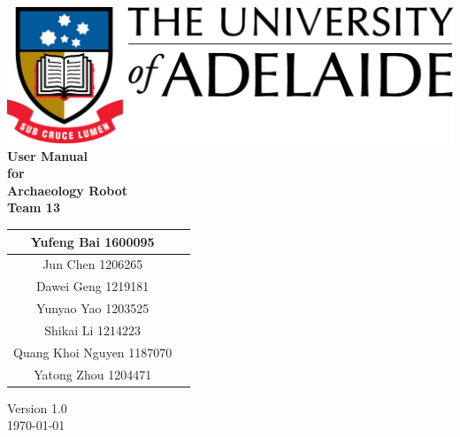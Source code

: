 \begin{center}
\includegraphics[scale=1.5]{./UniLogo}\\[1cm]    
\textbf{\Huge \bfseries User Manual}\\[1.5cm]
\textbf{\huge for}\\[0.5cm]


\textbf{ \huge Archaeology Robot }\\[0.3cm]
\textbf{ \huge Team 13 }\\[2cm]


\begin{tabular}{ |c | p{2cm} |}
	\hline
Yufeng Bai 1600095 & \\[.5cm] \hline
Jun Chen 1206265 & \\[.5cm] \hline
Dawei Geng 1219181 & \\[.5cm] \hline
Yunyao Yao 1203525 & \\[.5cm] \hline
Shikai Li 1214223 & \\[.5cm] \hline
Quang Khoi Nguyen 1187070  & \\[.5cm] \hline
Yatong Zhou 1204471 & \\[.5cm] \hline
\end{tabular}


\vfill

Version 1.0 \\ [0.2cm]
{\large \today}

\end{center}

